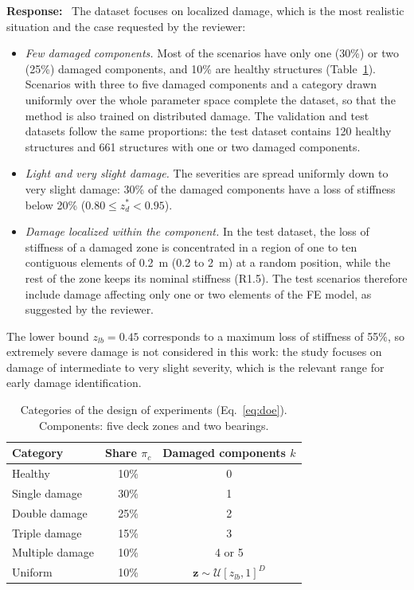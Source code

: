 \documentclass[11pt]{article}
\newenvironment{response}{\par\smallskip\noindent\color{resp}\textbf{Response:}\ }{\par}
\newcommand{\z}{\mathbf{z}}
\begin{document}
\begin{response}
The dataset focuses on localized damage, which is the most realistic situation and the case requested by the reviewer:
\begin{itemize}[leftmargin=*]
\item \emph{Few damaged components.} Most of the scenarios have only one (30\%) or two (25\%) damaged components, and 10\%
are healthy structures (Table~\ref{tab:doe}). Scenarios with three to five damaged components and a category drawn
uniformly over the whole parameter space complete the dataset, so that the method is also trained on distributed damage.
The validation and test datasets follow the same proportions: the test dataset contains 120 healthy structures and 661
structures with one or two damaged components.
\item \emph{Light and very slight damage.} The severities are spread uniformly down to very slight damage: 30\% of the
damaged components have a loss of stiffness below 20\% ($0.80\le z_d^*<0.95$).
\item \emph{Damage localized within the component.} In the test dataset, the loss of stiffness of a damaged zone is
concentrated in a region of one to ten contiguous elements of 0.2~m (0.2 to 2~m) at a random position, while the rest of
the zone keeps its nominal stiffness (R1.5). The test scenarios therefore include damage affecting only one or two
elements of the FE model, as suggested by the reviewer.
\end{itemize}
The lower bound $z_{lb}=0.45$ corresponds to a maximum loss of stiffness of 55\%, so extremely severe damage is not
considered in this work: the study focuses on damage of intermediate to very slight severity, which is the relevant
range for early damage identification.

\begin{table}[H]
\centering\small
\caption{Categories of the design of experiments (Eq.~\eqref{eq:doe}). Components: five deck zones and two bearings.}
\label{tab:doe}
\begin{tabular}{lcc}
\toprule
Category & Share $\pi_c$ & Damaged components $k$ \\
\midrule
Healthy & 10\% & 0 \\
Single damage & 30\% & 1 \\
Double damage & 25\% & 2 \\
Triple damage & 15\% & 3 \\
Multiple damage & 10\% & 4 or 5 \\
Uniform & 10\% & $\z\sim\mathcal{U}[z_{lb},1]^D$ \\
\bottomrule
\end{tabular}
\end{table}


\end{response}
\end{document}
